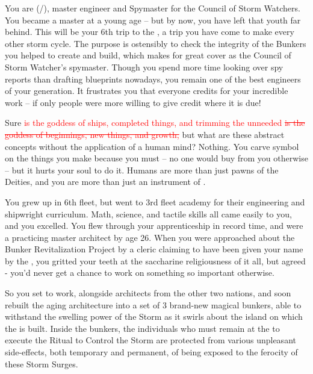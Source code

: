 \documentclass[char]{GL2020}
\begin{document}
\name{\cBunker{}}

You are \cBunker{\full} (\cBunker{\they}/\cBunker{\them}), master engineer and Spymaster for the \pShip{} Council of Storm Watchers. You became a master at a young age -- but by now, you have left that youth far behind. This will be your 6th trip to the \pSchool{}, a trip you have come to make every other storm cycle. The purpose is ostensibly to check the integrity of the Bunkers you helped to create and build, which makes for great cover as the Council of Storm Watcher's spymaster. Though you spend more time looking over spy reports than drafting blueprints nowadays, you remain one of the best engineers of your generation. It frustrates you that everyone credits \textcolor{red}{\cEbbFull{\full} \sout{\cFlowFull{\full}}} for your incredible work -- if only people were more willing to give credit where it is due!

Sure \textcolor{red}{\cEbb{} is the goddess of ships, completed things, and trimming the unneeded \sout{\cFlow{} is the goddess of beginnings, new things, and growth,}} but what are these abstract concepts without the application of a human mind? Nothing. You carve \cEbb{\their} symbol on the things you make because you must -- no one would buy from you otherwise -- but it hurts your soul to do it. Humans are more than just pawns of the Deities, and you are more than just an instrument of \textcolor{red}{\cEbb{}}. 

You grew up in 6th fleet, but went to 3rd fleet academy for their engineering and shipwright curriculum. Math, science, and tactile skills all came easily to you, and you excelled. You flew through your apprenticeship in record time, and were a practicing master architect by age 26. When you were approached about the Bunker Revitalization Project by a \cFlow{} cleric claiming to have been given your name by the \cFlow{\God} \cFlow{\themself}, you gritted your teeth at the saccharine religiousness of it all, but agreed - you'd never get a chance to work on something so important otherwise. 

So you set to work, alongside architects from the other two nations, and soon rebuilt the aging architecture into a set of 3 brand-new magical bunkers, able to withstand the swelling power of the Storm as it swirls about the island on which the \pSchool{} is built. Inside the bunkers, the individuals who must remain at the \pSc{} to execute the Ritual to Control the Storm are protected from various unpleasant side-effects, both temporary and permanent, of being exposed to the ferocity of these Storm Surges.
\end{document}
